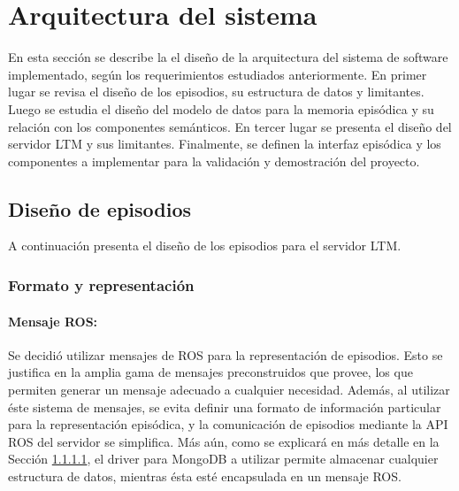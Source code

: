 
 
\section{Arquitectura del sistema}
 
En esta sección se describe la el diseño de la arquitectura del sistema de software implementado, según los requerimientos estudiados anteriormente. En primer lugar se revisa el diseño de los episodios, su estructura de datos y limitantes. Luego se estudia el diseño del modelo de datos para la memoria episódica y su relación con los componentes semánticos. En tercer lugar se presenta el diseño del servidor LTM y sus limitantes. Finalmente, se definen la interfaz episódica y los componentes a implementar para la validación y demostración del proyecto.
 
 
\subsection{Diseño de episodios}

A continuación presenta el diseño de los episodios para el servidor LTM. 


\subsubsection{Formato y representación}

\paragraph{Mensaje ROS:}
Se decidió utilizar mensajes de ROS para la representación de episodios. Esto se justifica en la amplia gama de mensajes preconstruidos que provee, los que permiten generar un mensaje adecuado a cualquier necesidad. Además, al utilizar éste sistema de mensajes, se evita definir una formato de información particular para la representación episódica, y la comunicación de episodios mediante la API ROS del servidor se simplifica. Más aún, como se explicará en más detalle en la Sección \ref{}, el driver para MongoDB a utilizar permite almacenar cualquier estructura de datos, mientras ésta esté encapsulada en un mensaje ROS.

